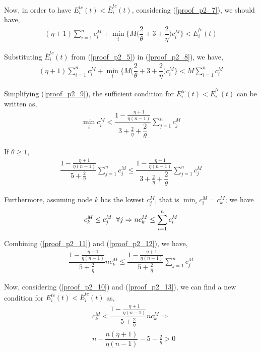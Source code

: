 \documentclass[journal,12pt, onecolumn]{IEEEtran}
\begin{document}
Now, in order to have $E_i^{tc}(t)  < \bar{E}_i^{tc}(t) $, considering (\ref{proof_p2_7}), we should have,
\begin{align}
\label{proof_p2_8}
(\eta +1) \sum_{i=1}^n c_i^M  + 
 \min_i \Big\{   M \Big( \dfrac{2}{\theta} + 3+\dfrac{2}{\eta} \Big)c_i ^{M}  \Big\} 
 < \bar{E}_i^{tc}(t) 
 \end{align}
 
Substituting $\bar{E}_i^{tc}(t) $ from (\ref{proof_p2_5}) in  (\ref{proof_p2_8}), we have,
\begin{align}
\label{proof_p2_9}
(\eta +1) \sum_{i=1}^n c_i^M  + 
 \min_i \Big\{   M \Big( \dfrac{2}{\theta} + 3+\dfrac{2}{\eta} \Big)c_i ^{M}  \Big\} 
 < M \sum_{i=1}^n c_i^M
 \end{align}
 
Simplifying (\ref{proof_p2_9}), the sufficient condition for $E_i^{tc}(t)  < \bar{E}_i^{tc}(t) $ can be written as,
\begin{align}
\label{proof_p2_10}
\min_i c_i^M < \dfrac{1- \frac{\eta +1}{\eta(n-1)}}{3+ \frac{2}{\eta} +  \dfrac{2}{\theta} } \sum_{j=1}^n c_j^M
\end{align}

If $\theta \geq1$, 
\begin{align}
\label{proof_p2_11}
\dfrac{1- \frac{\eta +1}{\eta(n-1)}}{5+ \frac{2}{\eta}} \sum_{j=1}^n c_j^M
\leq \dfrac{1- \frac{\eta +1}{\eta(n-1)}}{3+ \frac{2}{\eta} +  \dfrac{2}{\theta} } \sum_{j=1}^n c_j^M
\end{align}

Furthermore, assuming node $k$ has the lowest $c_j^M$, that is $\min_i c_i^M = c_k^M$; we have 
\begin{align}
\label{proof_p2_12}
c_k^M \leq c_j^M \hspace{2mm} \forall j \Rightarrow nc_k^M \leq \sum_{i=1}^n c_i^M 
\end{align}

Combining (\ref{proof_p2_11}) and (\ref{proof_p2_12}), we have,
\begin{align}
\label{proof_p2_13}
\dfrac{1- \frac{\eta +1}{\eta(n-1)}}{5+ \frac{2}{\eta}} nc_k^M
\leq \dfrac{1- \frac{\eta +1}{\eta(n-1)}}{5+ \frac{2}{\eta}} \sum_{j=1}^n c_j^M
\end{align}

Now, considering  (\ref{proof_p2_10}) and (\ref{proof_p2_13}), we can find a new condition for $E_i^{tc}(t)  < \bar{E}_i^{tc}(t) $ as,
\begin{align}
\label{proof_p2_14}
&c_k^M <\dfrac{1- \frac{\eta +1}{\eta(n-1)}}{5+ \frac{2}{\eta}} nc_k^M 
\Rightarrow  \nonumber \\
&n - \dfrac{n(\eta +1)}{\eta(n-1)} -5 - \frac{2}{\eta} >0
\end{align}
\end{document}
